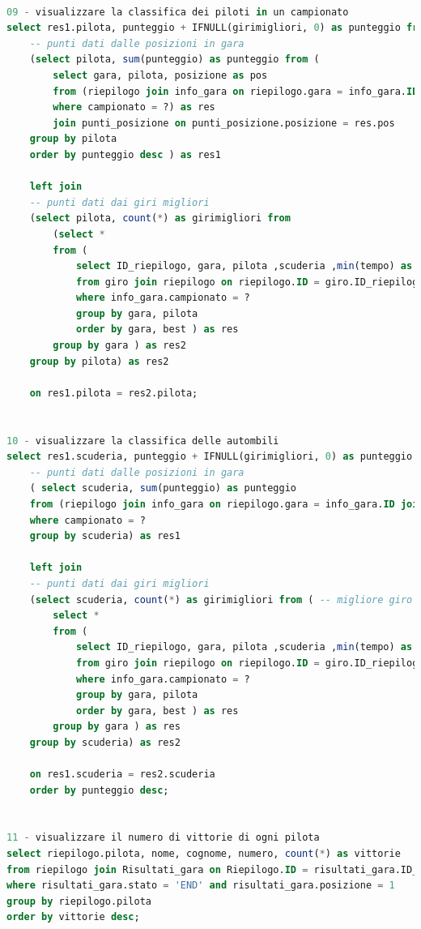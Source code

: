 \documentclass[a4paper,12pt]{report}
\begin{document}
\begin{lstlisting}[language=SQL]
	
09 - visualizzare la classifica dei piloti in un campionato
select res1.pilota, punteggio + IFNULL(girimigliori, 0) as punteggio from
	-- punti dati dalle posizioni in gara
	(select pilota, sum(punteggio) as punteggio from (
		select gara, pilota, posizione as pos
		from (riepilogo join info_gara on riepilogo.gara = info_gara.ID join risultati_gara on risultati_gara.ID_riepilogo = riepilogo.ID)
		where campionato = ?) as res
		join punti_posizione on punti_posizione.posizione = res.pos
	group by pilota
	order by punteggio desc ) as res1

	left join 
	-- punti dati dai giri migliori
	(select pilota, count(*) as girimigliori from 
		(select * 
		from (
			select ID_riepilogo, gara, pilota ,scuderia ,min(tempo) as best
			from giro join riepilogo on riepilogo.ID = giro.ID_riepilogo  join info_gara on info_gara.ID = riepilogo.gara
			where info_gara.campionato = ?
			group by gara, pilota
			order by gara, best ) as res
		group by gara ) as res2
	group by pilota) as res2

	on res1.pilota = res2.pilota;

	
10 - visualizzare la classifica delle autombili
select res1.scuderia, punteggio + IFNULL(girimigliori, 0) as punteggio from 
	-- punti dati dalle posizioni in gara
	( select scuderia, sum(punteggio) as punteggio
	from (riepilogo join info_gara on riepilogo.gara = info_gara.ID join risultati_gara on risultati_gara.ID_riepilogo = riepilogo.ID join punti_posizione on risultati_gara.posizione = punti_posizione.posizione)
	where campionato = ? 
	group by scuderia) as res1

	left join 
	-- punti dati dai giri migliori
	(select scuderia, count(*) as girimigliori from ( -- migliore giro per scuderia
		select *
		from (
			select ID_riepilogo, gara, pilota ,scuderia ,min(tempo) as best
			from giro join riepilogo on riepilogo.ID = giro.ID_riepilogo join info_gara on info_gara.ID = riepilogo.gara
			where info_gara.campionato = ?
			group by gara, pilota
			order by gara, best ) as res
		group by gara ) as res
	group by scuderia) as res2

	on res1.scuderia = res2.scuderia
	order by punteggio desc;

	
11 - visualizzare il numero di vittorie di ogni pilota
select riepilogo.pilota, nome, cognome, numero, count(*) as vittorie
from riepilogo join Risultati_gara on Riepilogo.ID = risultati_gara.ID_riepilogo join pilota on pilota.sigla = riepilogo.pilota
where risultati_gara.stato = 'END' and risultati_gara.posizione = 1
group by riepilogo.pilota
order by vittorie desc;



\end{lstlisting}
\end{document}
